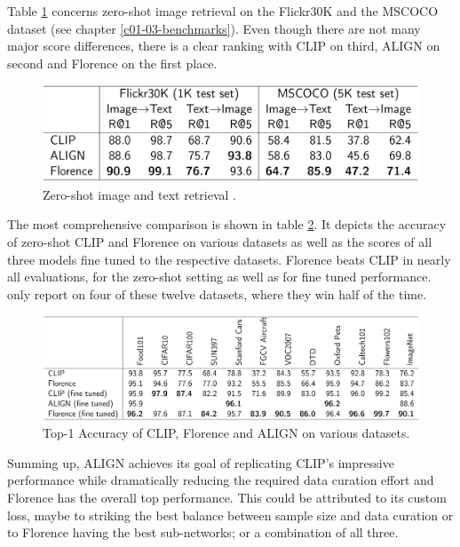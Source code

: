 \documentclass[
]{krantz}
\begin{document}
Table \ref{fig:table2} concerns zero-shot image retrieval on the Flickr30K and the MSCOCO dataset (see chapter \ref{c01-03-benchmarks}).
Even though there are not many major score differences, there is a clear ranking with CLIP on third, ALIGN on second and Florence on the first place.

\begin{figure}

{\centering \includegraphics[width=1\linewidth]{figures/02-04-text-support-img/table-img-txt-retrieval} 

}

\caption{Zero-shot image and text retrieval \citep{yuan2021florence}.}\label{fig:table2}
\end{figure}



The most comprehensive comparison is shown in table \ref{fig:table3}.
It depicts the accuracy of zero-shot CLIP and Florence on various datasets as well as the scores of all three models fine tuned to the respective datasets.
Florence beats CLIP in nearly all evaluations, for the zero-shot setting as well as for fine tuned performance.
\citet{jia2021scaling} only report on four of these twelve datasets, where they win half of the time.

\begin{figure}

{\centering \includegraphics[width=1\linewidth]{figures/02-04-text-support-img/table-misc-datasets} 

}

\caption{Top-1 Accuracy of CLIP, Florence and ALIGN on various datasets.}\label{fig:table3}
\end{figure}



Summing up, ALIGN achieves its goal of replicating CLIP's impressive performance while dramatically reducing the required data curation effort and Florence has the overall top performance.
This could be attributed to its custom loss, maybe to \citet{yuan2021florence} striking the best balance between sample size and data curation or to Florence having the best sub-networks; or a combination of all three.
\end{document}
